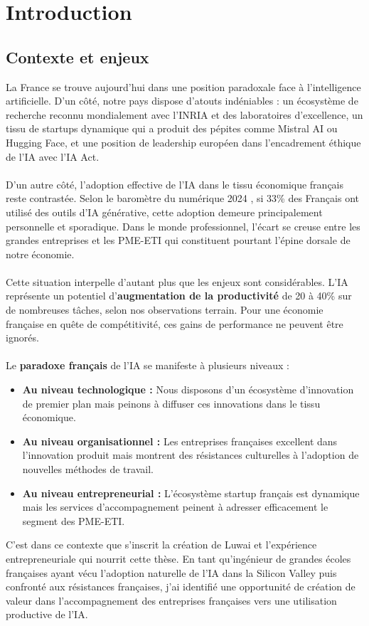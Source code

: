 \chapter{Introduction}
\label{chap:introduction}

\section{Contexte et enjeux}

La France se trouve aujourd'hui dans une position paradoxale face à l'intelligence artificielle. D'un côté, notre pays dispose d'atouts indéniables : un écosystème de recherche reconnu mondialement avec l'INRIA et des laboratoires d'excellence, un tissu de startups dynamique qui a produit des pépites comme Mistral AI ou Hugging Face, et une position de leadership européen dans l'encadrement éthique de l'IA avec l'IA Act.
\\\\
D'un autre côté, l'adoption effective de l'IA dans le tissu économique français reste contrastée. Selon le baromètre du numérique 2024 \cite{laboratoire2025how}, si 33\% des Français ont utilisé des outils d'IA générative, cette adoption demeure principalement personnelle et sporadique. Dans le monde professionnel, l'écart se creuse entre les grandes entreprises et les PME-ETI qui constituent pourtant l'épine dorsale de notre économie.
\\\\
Cette situation interpelle d'autant plus que les enjeux sont considérables. L'IA représente un potentiel d'\textbf{augmentation de la productivité} de 20 à 40\% sur de nombreuses tâches, selon nos observations terrain. Pour une économie française en quête de compétitivité, ces gains de performance ne peuvent être ignorés.
\\\\
Le \textbf{paradoxe français} de l'IA se manifeste à plusieurs niveaux :
\\
\begin{itemize}
    \item \textbf{Au niveau technologique :} Nous disposons d'un écosystème d'innovation de premier plan mais peinons à diffuser ces innovations dans le tissu économique.
    \item \textbf{Au niveau organisationnel :} Les entreprises françaises excellent dans l'innovation produit mais montrent des résistances culturelles à l'adoption de nouvelles méthodes de travail.
    \item \textbf{Au niveau entrepreneurial :} L'écosystème startup français est dynamique mais les services d'accompagnement peinent à adresser efficacement le segment des PME-ETI.
\end{itemize}
C'est dans ce contexte que s'inscrit la création de Luwai et l'expérience entrepreneuriale qui nourrit cette thèse. En tant qu'ingénieur de grandes écoles françaises ayant vécu l'adoption naturelle de l'IA dans la Silicon Valley puis confronté aux résistances françaises, j'ai identifié une opportunité de création de valeur dans l'accompagnement des entreprises françaises vers une utilisation productive de l'IA.

